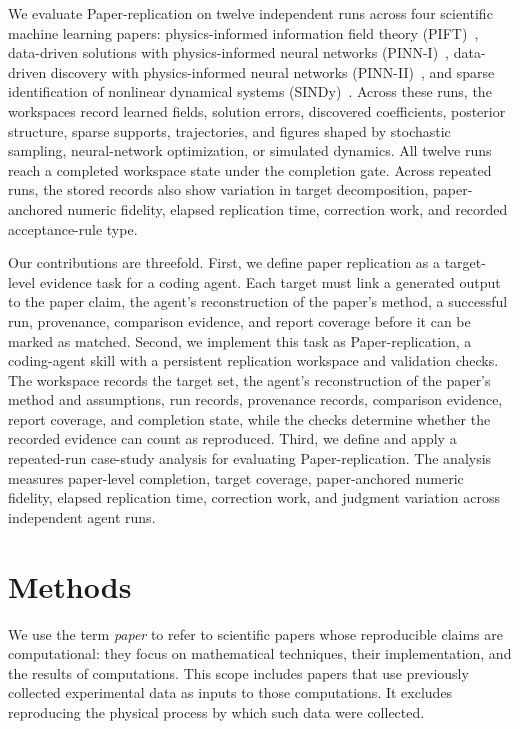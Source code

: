 \documentclass[authoryear,5p,times,nopreprintline]{elsarticle}
\begin{document}
We evaluate Paper-replication on twelve independent runs across four scientific machine learning papers: physics-informed information field theory (PIFT)~\citep{alberts2023physics}, data-driven solutions with physics-informed neural networks (PINN-I)~\citep{raissi2017physics}, data-driven discovery with physics-informed neural networks (PINN-II)~\citep{Raissi2017PhysicsID}, and sparse identification of nonlinear dynamical systems (SINDy)~\citep{brunton2016discovering}.
Across these runs, the workspaces record learned fields, solution errors, discovered coefficients, posterior structure, sparse supports, trajectories, and figures shaped by stochastic sampling, neural-network optimization, or simulated dynamics.
All twelve runs reach a completed workspace state under the completion gate.
Across repeated runs, the stored records also show variation in target decomposition, paper-anchored numeric fidelity, elapsed replication time, correction work, and recorded acceptance-rule type.

Our contributions are threefold.
First, we define paper replication as a target-level evidence task for a coding agent.
Each target must link a generated output to the paper claim, the agent's reconstruction of the paper's method, a successful run, provenance, comparison evidence, and report coverage before it can be marked as matched.
Second, we implement this task as Paper-replication, a coding-agent skill with a persistent replication workspace and validation checks.
The workspace records the target set, the agent's reconstruction of the paper's method and assumptions, run records, provenance records, comparison evidence, report coverage, and completion state, while the checks determine whether the recorded evidence can count as reproduced.
Third, we define and apply a repeated-run case-study analysis for evaluating Paper-replication.
The analysis measures paper-level completion, target coverage, paper-anchored numeric fidelity, elapsed replication time, correction work, and judgment variation across independent agent runs.

\section{Methods}\label{sec:method}
We use the term \emph{paper} to refer to scientific papers whose reproducible claims are computational: they focus on mathematical techniques, their implementation, and the results of computations.
This scope includes papers that use previously collected experimental data as inputs to those computations.
It excludes reproducing the physical process by which such data were collected.
\end{document}
